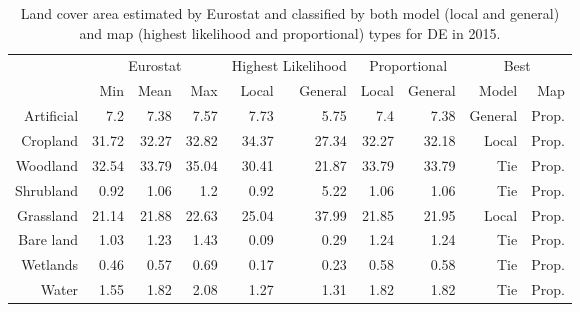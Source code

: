     \begin{table}[H]
    \centering
    \caption{Land cover area estimated by Eurostat and classified by both model (local and general) and map (highest likelihood and proportional) types for DE in 2015.}
    
    \begin{tabular}{r|rrr|rr|rr|rr}
    \toprule
    {} & \multicolumn{3}{|c}{Eurostat} & \multicolumn{2}{|c}{Highest Likelihood} & \multicolumn{2}{|c}{Proportional} & \multicolumn{2}{|c}{Best} \\
    {} &      Min &   Mean &    Max &              Local & General &        Local & General &    Model &    Map \\
    \midrule
    Artificial &      7.2 &   7.38 &   7.57 &               7.73 &    5.75 &          7.4 &    7.38 &  General &  Prop. \\
    Cropland   &    31.72 &  32.27 &  32.82 &              34.37 &   27.34 &        32.27 &   32.18 &    Local &  Prop. \\
    Woodland   &    32.54 &  33.79 &  35.04 &              30.41 &   21.87 &        33.79 &   33.79 &      Tie &  Prop. \\
    Shrubland  &     0.92 &   1.06 &    1.2 &               0.92 &    5.22 &         1.06 &    1.06 &      Tie &  Prop. \\
    Grassland  &    21.14 &  21.88 &  22.63 &              25.04 &   37.99 &        21.85 &   21.95 &    Local &  Prop. \\
    Bare land  &     1.03 &   1.23 &   1.43 &               0.09 &    0.29 &         1.24 &    1.24 &      Tie &  Prop. \\
    Wetlands   &     0.46 &   0.57 &   0.69 &               0.17 &    0.23 &         0.58 &    0.58 &      Tie &  Prop. \\
    Water      &     1.55 &   1.82 &   2.08 &               1.27 &    1.31 &         1.82 &    1.82 &      Tie &  Prop. \\
    \bottomrule
    \end{tabular}
    \end{table}
    
